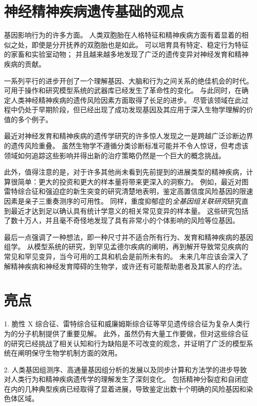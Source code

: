 \section{神经精神疾病遗传基础的观点}

基因影响行为的许多方面。 
人类双胞胎在人格特征和精神疾病方面有着显着的相似之处，即使是分开抚养的双胞胎也是如此。 
可以培育具有特定、稳定行为特征的家畜和实验室动物； 
并且越来越多地发现了广泛的遗传变异对神经发育和精神疾病的贡献。


一系列平行的进步开创了一个理解基因、大脑和行为之间关系的绝佳机会的时代。 
可用于操作和研究模型系统的武器库已经发生了革命性的变化。 
与此同时，在确定人类神经精神疾病的遗传风险因素方面取得了长足的进步。 
尽管该领域在此过程中仍处于早期阶段，但已经出现了成功发现基因及其应用于深入生物学理解的价值的多个例子。


最近对神经发育和精神疾病的遗传学研究的许多惊人发现之一是跨越广泛诊断边界的遗传风险重叠。 
虽然生物学不遵循分类诊断标准可能并不令人惊讶，但考虑该领域如何追踪这些影响并得出新的治疗策略仍然是一个巨大的概念挑战。


此外，值得注意的是，对于许多其他尚未看到先前提到的进展类型的精神疾病，计算很简单：更大的投资和更大的样本量将带来更深入的洞察力。 
例如，最近对图雷特综合征和强迫症的新生突变的研究清楚地表明，鉴定高置信度风险基因的限速因素是亲子三重奏测序的可用性。 
同样，重度抑郁症的\textit{全基因组关联研究}研究直到最近才达到足以确认具有统计学意义的相关常见变异的样本量。 
这些研究包括了数十万人，并且毫不奇怪地发现了具有非常小的个体影响的风险等位基因。


最后一点强调了一种想法，即一种尺寸并不适合所有行为、发育和精神疾病的基因组学。 
从模型系统的研究，到罕见孟德尔疾病的阐明，再到解开导致常见疾病的常见和罕见变异，当今可用的工具和机会是前所未有的。 
未来几年应该会深入了解精神疾病和神经发育障碍的生物学，或许还有可能帮助患者及其家人的疗法。


\section{亮点}

1. 脆性 X 综合征、雷特综合征和威廉姆斯综合征等罕见遗传综合征为复杂人类行为的分子机制提供了重要见解。 
此外，虽然仍有大量工作要做，但对这些综合征的研究已经挑战了相关认知和行为缺陷是不可改变的观念，并证明了广泛的模型系统在阐明保守生物学机制方面的效用。


2. 人类基因组测序、高通量基因组分析的发展以及同步计算和方法学的进步导致对人类行为和精神疾病遗传学的理解发生了深刻变化。 
包括精神分裂症和自闭症在内的几种典型疾病已经取得了显着进展，导致鉴定出数十个明确的风险基因和染色体区域。


